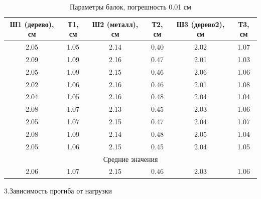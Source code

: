\documentclass[a4paper, 12pt]{article}
\begin{document}
\begin{table}[h]
\centering
\caption{Параметры балок, погрешность 0.01 см}
\begin{tabular}{|c|c|c|c|c|c|}
\hline
Ш1 (дерево), см & Т1, см & Ш2 (металл), см & Т2, см & Ш3 (дерево2), см & Т3, см\\
\hline
2.05 & 1.05 & 2.14 & 0.40 & 2.02 & 1.07 \\
\hline
2.09 & 1.09 & 2.16 & 0.47 & 2.01 & 1.03 \\
\hline
2.05 & 1.09 & 2.15 & 0.46 & 2.06 & 1.06 \\
\hline
2.02 & 1.06 & 2.16 & 0.46 & 2.01 & 1.08 \\
\hline
2.04 & 1.05 & 2.16 & 0.48 & 2.04 & 1.04 \\
\hline
2.08 & 1.07 & 2.13 & 0.45 & 2.03 & 1.06 \\
\hline
2.05 & 1.07 & 2.15 & 0.47 & 2.04 & 1.07 \\
\hline
2.08 & 1.09 & 2.14 & 0.48 & 2.05 & 1.04 \\
\hline
2.05 & 1.06 & 2.15 & 0.45 & 2.04 & 1.05 \\
\hline
\multicolumn{6}{|c|}{Средние значения} \\
\hline
2.06 & 1.07 & 2.15 & 0.46 & 2.03 & 1.06 \\
\hline
\end{tabular}
\end{table}

3.Зависимость прогиба от нагрузки
\end{document}
